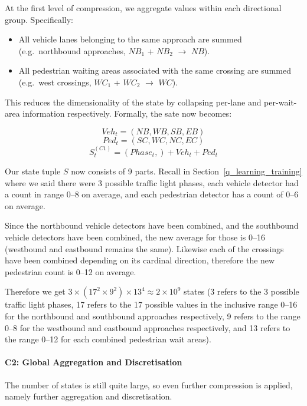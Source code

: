 \documentclass[a4paper]{report}
\begin{document}
At the first level of compression, we aggregate values within each directional group. Specifically:

\begin{itemize}
  \item All vehicle lanes belonging to the same approach are summed (e.g.\ northbound approaches, $NB_1$ + $NB_2$ $\rightarrow$ $NB$).
  \item All pedestrian waiting areas associated with the same crossing are summed (e.g.\ west crossings, $WC_1$ + $WC_2$ $\rightarrow$ $WC$).
\end{itemize}

This reduces the dimensionality of the state by collapsing per-lane and per-wait-area information respectively. Formally, the sate now becomes:

\[
  Veh_t = (NB, WB, SB, EB)
\]
\[
  Ped_t = (SC, WC, NC, EC)
\]
\begin{equation}
  S_t^{(C1)} = (Phase_t,) + Veh_t + Ped_t
\end{equation}

Our state tuple $S$ now consists of 9 parts. Recall in Section~\ref{q_learning_training} where we said there were 3 possible traffic light phases, each vehicle detector had a count in range 0--8 on average, and each pedestrian detector has a count of 0--6 on average.

Since the northbound vehicle detectors have been combined, and the southbound vehicle detectors have been combined, the new average for those is 0--16 (westbound and eastbound remains the same). Likewise each of the crossings have been combined depending on its cardinal direction, therefore the new pedestrian count is 0--12 on average.

Therefore we get $3\times(17^2\times9^2)\times13^4\approx2\times10^{9}$ states (3 refers to the 3 possible traffic light phases, 17 refers to the 17 possible values in the inclusive range 0--16 for the northbound and southbound approaches respectively, 9 refers to the range 0--8 for the westbound and eastbound approaches respectively, and 13 refers to the range 0--12 for each combined pedestrian wait areas).

\paragraph{C2: Global Aggregation and Discretisation}

The number of states is still quite large, so even further compression is applied, namely further aggregation and discretisation.
\end{document}
